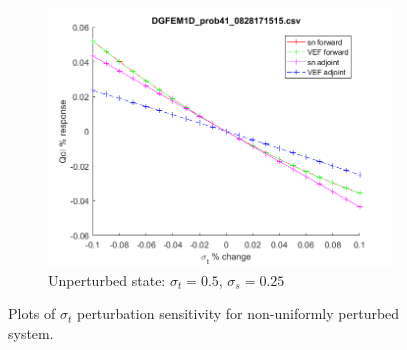 \documentclass{article}
\newcommand{\sigt}{\sigma_t}
\newcommand{\sigs}{\sigma_s}
\begin{document}
\begin{figure}[H]
\begin{subfigure}{.65\textwidth}
  \centering
  \includegraphics[width=.98\linewidth]{figures/41sigtSens.png}
  \caption{Unperturbed state: $\sigt=0.5$, $\sigs=0.25$}
  \label{fig:sfig3}
\end{subfigure}
\caption{Plots of $\sigt$ perturbation sensitivity for non-uniformly perturbed system.}
\label{fig:fig}
\end{figure}
\end{document}
